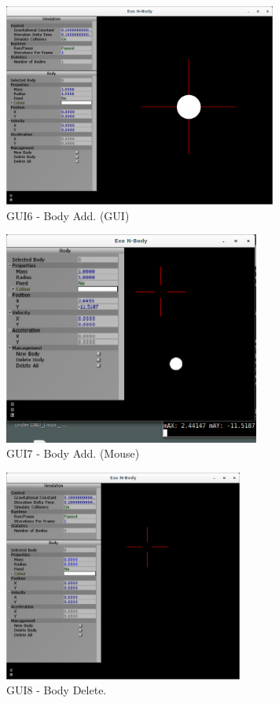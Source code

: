 \begin{figure}[H]
  \centering
  \includegraphics[width=0.8\textwidth]{img/testingEvidence/gui6.png}
  \caption{GUI6 - Body Add. (GUI)}
\end{figure}

\begin{figure}[H]
  \centering
  \includegraphics[width=0.75\textwidth]{img/testingEvidence/gui7.png}
  \caption{GUI7 - Body Add. (Mouse)}
\end{figure}

\begin{figure}[H]
  \centering
  \includegraphics[width=0.7\textwidth]{img/testingEvidence/gui8.png}
  \caption{GUI8 - Body Delete.}
\end{figure}

